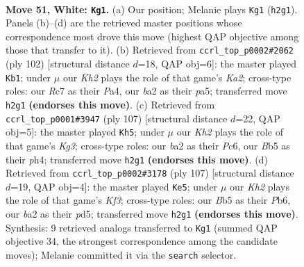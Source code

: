\documentclass[11pt]{article}
\begin{document}
\clearpage

\begin{figure}[p]\centering
\begin{subfigure}{0.46\textwidth}\centering
\resizebox{\linewidth}{!}{%
\newchessgame
\chessboard[
  setfen={7k/2R5/4r3/1B6/4p2p/4Bp1P/b4P1K/8 w - - 12 51},
  showmover=false,
  pgfstyle=straightmove, color=movearrow, markmove={h2-g1}
]}
\caption{}
\end{subfigure}\hfill
\begin{subfigure}{0.46\textwidth}\centering
\resizebox{\linewidth}{!}{%
\newchessgame
\chessboard[
  setfen={8/3k4/5b2/p2p4/Pp1p4/3B4/KPP5/8 w - - 4 52},
  showmover=false,
  pgfstyle=straightmove, color=movearrow, markmove={a2-b1}
]}
\caption{}
\end{subfigure}
\\[4pt]
\begin{subfigure}{0.46\textwidth}\centering
\resizebox{\linewidth}{!}{%
\newchessgame
\chessboard[
  setfen={8/8/2p3k1/5p2/p4PbP/P3K1P1/8/4B3 b - - 18 54},
  showmover=false,
  pgfstyle=straightmove, color=movearrow, markmove={g6-h5}
]}
\caption{}
\end{subfigure}\hfill
\begin{subfigure}{0.46\textwidth}\centering
\resizebox{\linewidth}{!}{%
\newchessgame
\chessboard[
  setfen={8/2r5/1p3k2/p2P2p1/Pb4B1/3KP3/5P2/R7 b - - 0 54},
  showmover=false,
  pgfstyle=straightmove, color=movearrow, markmove={f6-e5}
]}
\caption{}
\end{subfigure}
\caption{\textbf{Move 51, White: \texttt{Kg1}.} (a) Our position; Melanie plays \texttt{Kg1} (\texttt{h2g1}). Panels (b)--(d) are the retrieved master positions whose correspondence most drove this move (highest QAP objective among those that transfer to it). (b) Retrieved from \texttt{ccrl\_top\_p0002\#2062} (ply 102) [structural distance $d$=18, QAP obj=6]: the master played \texttt{Kb1}; under $\mu$ our \emph{Kh2} plays the role of that game's \emph{Ka2}; cross-type roles: our \emph{R}c7 as their \emph{P}a4, our \emph{b}a2 as their \emph{p}a5; transferred move \texttt{h2g1} \textbf{(endorses this move)}. (c) Retrieved from \texttt{ccrl\_top\_p0001\#3947} (ply 107) [structural distance $d$=22, QAP obj=5]: the master played \texttt{Kh5}; under $\mu$ our \emph{Kh2} plays the role of that game's \emph{Kg3}; cross-type roles: our \emph{b}a2 as their \emph{P}c6, our \emph{B}b5 as their \emph{p}h4; transferred move \texttt{h2g1} \textbf{(endorses this move)}. (d) Retrieved from \texttt{ccrl\_top\_p0002\#3178} (ply 107) [structural distance $d$=19, QAP obj=4]: the master played \texttt{Ke5}; under $\mu$ our \emph{Kh2} plays the role of that game's \emph{Kf3}; cross-type roles: our \emph{B}b5 as their \emph{P}b6, our \emph{b}a2 as their \emph{p}d5; transferred move \texttt{h2g1} \textbf{(endorses this move)}. Synthesis: 9 retrieved analogs transferred to \texttt{Kg1} (summed QAP objective 34, the strongest correspondence among the candidate moves); Melanie committed it via the \texttt{search} selector.}
\label{fig:thought-m100}
\end{figure}
\end{document}
